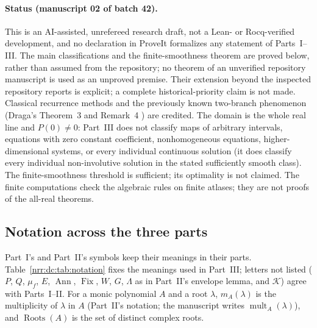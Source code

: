 \documentclass[11pt,letterpaper]{article}
\theoremstyle{definition}
\theoremstyle{remark}
\newcommand{\Ann}{\operatorname{Ann}}
\newcommand{\pcore}{\mathcal K}
\DeclareMathOperator{\Fix}{Fix}
\newcommand{\roots}{\operatorname{Roots}}
\begin{document}
\paragraph{Status (manuscript 02 of batch 42).}
This is an AI-assisted, unrefereed research draft, not a Lean- or
Rocq-verified development, and no declaration in ProveIt formalizes any
statement of Parts~I--III. The main classifications and the finite-smoothness
theorem are proved below, rather than assumed from the repository; no theorem
of an unverified repository manuscript is used as an unproved premise. Their
extension beyond the inspected repository reports is explicit; a complete
historical-priority claim is not made. Classical recurrence methods and the
previously known two-branch phenomenon (Draga's Theorem~3 and Remark~4
\cite{D2016}) are credited. The domain is the whole real line and $P(0)\ne0$:
Part~III does not classify maps of arbitrary intervals, equations with zero
constant coefficient, nonhomogeneous equations, higher-dimensional systems, or
every individual continuous solution (it does classify every individual
non-involutive solution in the stated sufficiently smooth class). The
finite-smoothness threshold is sufficient; its optimality is not claimed. The
finite computations check the algebraic rules on finite atlases; they are not
proofs of the all-real theorems.

\subsection{Notation across the three parts}
\label{nrr:dc:sec:notation}

Part~I's and Part~II's symbols keep their meanings in their parts.
Table~\ref{nrr:dc:tab:notation} fixes the meanings used in Part~III; letters
not listed ($P$, $Q$, $\mu_f$, $E$, $\Ann$, $\Fix$, $W$, $G$, $\Lambda$ as in
Part~II's envelope lemma, and $\pcore$) agree with Parts~I--II.
For a monic polynomial $A$ and a root $\lambda$, $m_A(\lambda)$ is the
multiplicity of $\lambda$ in $A$ (Part~II's notation; the manuscript writes
$\operatorname{mult}_A(\lambda)$), and $\roots(A)$ is the set of distinct
complex roots.
\end{document}
